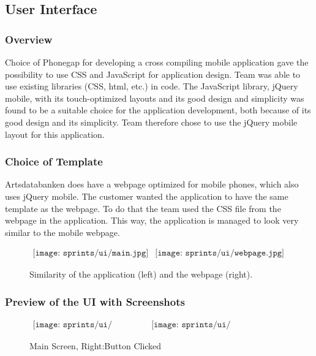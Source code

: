 \subsection{User Interface}
	\subsubsection{Overview}
	Choice of Phonegap for developing a cross compiling mobile application gave the possibility to use CSS and JavaScript for application design. Team was able to use existing libraries (CSS, html, etc.) in code. The JavaScript library, jQuery mobile, with its touch-optimized layouts and its good design and simplicity was found to be a suitable choice for the application development, both because of its good design and its simplicity. Team therefore chose to use the jQuery mobile layout for this application.

\subsubsection{Choice of Template}
Artsdatabanken does have a webpage optimized for mobile phones, which also uses jQuery mobile. The customer wanted the application to have the same template as the webpage. To do that the team used the CSS file from the webpage in the application. This way, the application is managed to look very similar to the mobile webpage.
\begin{figure}[h!]
 \begin{center}$
 \begin{array}{cc}
 \texttt{[image: sprints/ui/main.jpg]} &
 \texttt{[image: sprints/ui/webpage.jpg]}
 \end{array}$
 \end{center}
 \caption{Similarity of the application (left) and  the webpage (right). }
 \end{figure}





\newpage
\subsubsection{Preview of the UI with Screenshots}

\begin{figure}[h]
 \begin{center}$
 \begin{array}{cc}
 \texttt{[image: sprints/ui/main.jpg]} &
 \texttt{[image: sprints/ui/mainHover.jpg]}
 \end{array}$
 \end{center}
 \caption{Main Screen, Right:Button Clicked }
 \end{figure}

